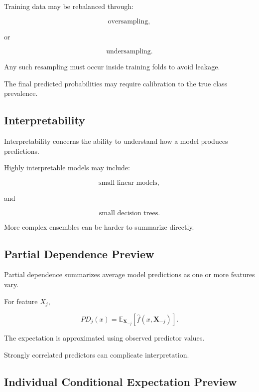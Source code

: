 Training data may be rebalanced through:

\[
\boxed{
\text{oversampling},
}
\]

or

\[
\boxed{
\text{undersampling}.
}
\]

Any such resampling must occur inside training folds to avoid leakage.

The final predicted probabilities may require calibration to the true
class prevalence.

\subsection{Interpretability}
\label{subsec:model-interpretability}

Interpretability concerns the ability to understand how a model produces
predictions.

Highly interpretable models may include:

\[
\boxed{
\text{small linear models},
}
\]

and

\[
\boxed{
\text{small decision trees}.
}
\]

More complex ensembles can be harder to summarize directly.

\subsection{Partial Dependence Preview}
\label{subsec:partial-dependence-preview}

Partial dependence summarizes average model predictions as one or more
features vary.

For feature \(X_j\),

\[
\boxed{
PD_j(x)
=
\mathbb{E}_{\mathbf{X}_{-j}}
[
\widehat{f}
(
x,\mathbf{X}_{-j}
)
].
}
\]

The expectation is approximated using observed predictor values.

Strongly correlated predictors can complicate interpretation.

\subsection{Individual Conditional Expectation Preview}
\label{subsec:ice-preview}

